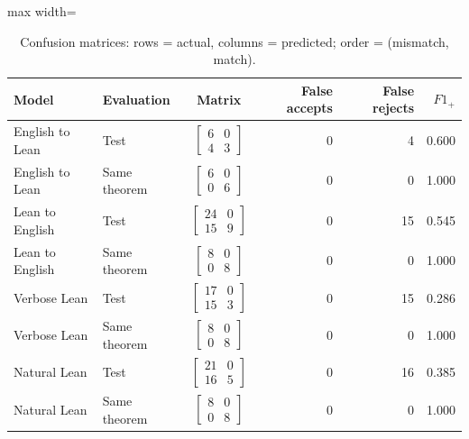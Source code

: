 \begin{table}[htbp]
\centering
\caption{Confusion matrices: rows = actual, columns = predicted; order = (mismatch, match).}
\label{tab:intermediaries-confusion}
\small
\begin{adjustbox}{max width=\textwidth}
\begin{tabular}{llcrrr}
\toprule
Model & Evaluation & Matrix & False accepts & False rejects & $F1_+$ \\
\midrule
English to Lean & Test & $\left[\begin{array}{rr}6&0\\4&3\end{array}\right]$ & 0 & 4 & 0.600 \\
English to Lean & Same theorem & $\left[\begin{array}{rr}6&0\\0&6\end{array}\right]$ & 0 & 0 & 1.000 \\
Lean to English & Test & $\left[\begin{array}{rr}24&0\\15&9\end{array}\right]$ & 0 & 15 & 0.545 \\
Lean to English & Same theorem & $\left[\begin{array}{rr}8&0\\0&8\end{array}\right]$ & 0 & 0 & 1.000 \\
Verbose Lean & Test & $\left[\begin{array}{rr}17&0\\15&3\end{array}\right]$ & 0 & 15 & 0.286 \\
Verbose Lean & Same theorem & $\left[\begin{array}{rr}8&0\\0&8\end{array}\right]$ & 0 & 0 & 1.000 \\
Natural Lean & Test & $\left[\begin{array}{rr}21&0\\16&5\end{array}\right]$ & 0 & 16 & 0.385 \\
Natural Lean & Same theorem & $\left[\begin{array}{rr}8&0\\0&8\end{array}\right]$ & 0 & 0 & 1.000 \\
\bottomrule
\end{tabular}
\end{adjustbox}
\end{table}
